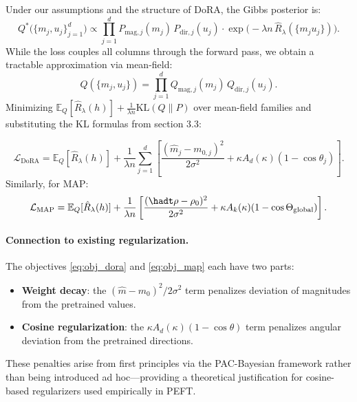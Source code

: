 \documentclass[11pt]{article}
\newcommand{\KL}{\mathrm{KL}}
\newcommand{\Ad}{A_d}
\newcommand{\Ak}{A_k}
\newcommand{\Rhatl}{\hat{R}_\lambda}
\newcommand{\E}{\mathbb{E}}
\begin{document}
Under our assumptions and the structure of DoRA, the
Gibbs posterior is:
\[
  Q^*\!\bigl(\{m_j, u_j\}_{j=1}^d\bigr)
  \propto \prod_{j=1}^d P_{\mathrm{mag},j}(m_j)\,P_{\mathrm{dir},j}(u_j)
  \cdot\exp\bigl(-\lambda n\,\Rhatl(\{m_j u_j\})\bigr).
\]
While the loss couples all columns through the forward pass, we obtain a
tractable approximation via mean-field:
\[
  Q(\{m_j, u_j\}) = \prod_{j=1}^d Q_{\mathrm{mag},j}(m_j)\,Q_{\mathrm{dir},j}(u_j).
\]
Minimizing $\E_Q[\Rhatl(h)] + \tfrac{1}{\lambda n}\KL(Q\|P)$ over
mean-field families and substituting the KL formulas from
section 3.3:

\begin{equation}
  \mathcal{L}_{\mathrm{DoRA}}
  = \E_Q[\Rhatl(h)]
  + \frac{1}{\lambda n}\sum_{j=1}^d
    \left[\frac{(\hat{m}_j - m_{0,j})^2}{2\sigma^2}
    + \kappa \Ad(\kappa)(1-\cos\theta_j)\right].
\label{eq:obj_dora}
\end{equation}
Similarly, for MAP:
\begin{equation}
  \mathcal{L}_{\mathrm{MAP}}
  = \E_Q[\Rhatl(h)]
  + \frac{1}{\lambda n}
    \left[\frac{(\hadt\rho - \rho_0)^2}{2\sigma^2}
    + \kappa \Ak(\kappa)(1-\cos\Theta_{\mathrm{global}})\right].
\label{eq:obj_map}
\end{equation}

\paragraph{Connection to existing regularization.}
The objectives \eqref{eq:obj_dora} and \eqref{eq:obj_map} each have two
parts:
\begin{itemize}
  \item \textbf{Weight decay}: the $(\hat{m}-m_0)^2/2\sigma^2$ term
    penalizes deviation of magnitudes from the pretrained values.
  \item \textbf{Cosine regularization}: the $\kappa\Ad(\kappa)(1-\cos\theta)$
    term penalizes angular deviation from the pretrained directions.
\end{itemize}
These penalties arise from first principles via the PAC-Bayesian framework
rather than being introduced ad hoc—providing a theoretical justification
for cosine-based regularizers used empirically in PEFT.

\end{document}
